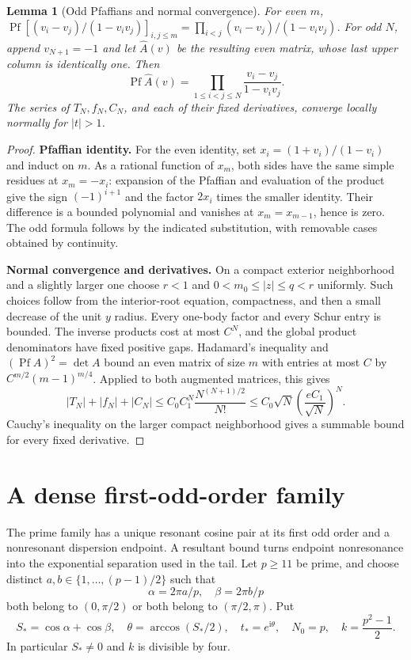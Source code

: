 \documentclass[11pt]{article}
\numberwithin{equation}{section}
\newtheorem{lemma}[theorem]{Lemma}
\theoremstyle{definition}
\newcommand{\ii}{\mathrm i}
\newcommand{\Pf}{\operatorname{Pf}}
\begin{document}
\begin{lemma}[Odd Pfaffians and normal convergence]\label{lem:schur}
For even $m$,
$\Pf[(v_i-v_j)/(1-v_iv_j)]_{i,j\le m}
=\prod_{i<j}(v_i-v_j)/(1-v_iv_j)$.
For odd $N$, append $v_{N+1}=-1$ and let $\widehat A(v)$ be the
resulting even matrix, whose last upper column is identically one.
Then
\[
 \Pf\widehat A(v)=\prod_{1\le i<j\le N}\frac{v_i-v_j}{1-v_iv_j}.
\]
The series of $T_N,f_N,C_N$, and each of their fixed derivatives,
converge locally normally for $|t|>1$.
\end{lemma}
\begin{proof}
\noindent\textbf{Pfaffian identity.} For the even identity, set $x_i=(1+v_i)/(1-v_i)$ and induct on
$m$. As a rational function of $x_m$, both sides have the same
simple residues at $x_m=-x_i$: expansion of the Pfaffian and
evaluation of the product give the sign $(-1)^{i+1}$ and the
factor $2x_i$ times the smaller identity. Their difference is a
bounded polynomial and vanishes at $x_m=x_{m-1}$, hence is zero.
The odd formula follows by the indicated substitution, with
removable cases obtained by continuity.

\par\smallskip\noindent\textbf{Normal convergence and derivatives.} On a compact exterior neighborhood and a slightly larger one choose
$r<1$ and $0<m_0\le |z|\le q<r$ uniformly. Such choices follow
from the interior-root equation, compactness, and then a small
decrease of the unit $y$ radius. Every one-body factor and every
Schur entry is bounded. The inverse products cost at most $C^N$,
and the global product denominators have fixed positive gaps.
Hadamard's inequality and $(\Pf A)^2=\det A$ bound an even
matrix of size $m$ with entries at most $C$ by
$C^{m/2}(m-1)^{m/4}$. Applied to both augmented matrices, this gives
\[
 |T_N|+|f_N|+|C_N|
 \le C_0 C_1^N\frac{N^{(N+1)/2}}{N!}
 \le C_0\sqrt N\left(\frac{eC_1}{\sqrt N}\right)^N.
\]
Cauchy's inequality on the larger compact neighborhood gives a summable
bound for every fixed derivative.
\end{proof}

\section{A dense first-odd-order family}\label{sec:arithmetic}

The prime family has a unique resonant cosine pair at its first odd
order and a nonresonant dispersion endpoint. A resultant bound turns
endpoint nonresonance into the exponential separation used in the tail.
Let $p\ge11$ be prime, and choose distinct
$a,b\in\{1,\ldots,(p-1)/2\}$ such that
\[
 \alpha=2\pi a/p,\quad\beta=2\pi b/p
\]
both belong to $(0,\pi/2)$ or both belong to $(\pi/2,\pi)$. Put
\[
 S_* =\cos\alpha+\cos\beta,
 \quad \theta=\arccos(S_*/2),\quad t_*=e^{\ii\theta},
 \quad N_0=p,\quad k=\frac{p^2-1}{2}.
\]
In particular $S_*\ne0$ and $k$ is divisible by four.
\end{document}
